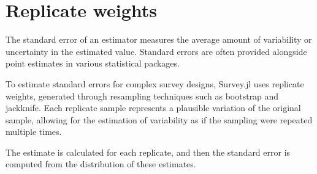 \documentclass{juliacon}
\begin{document}


\section{Replicate weights}

The standard error of an estimator measures the average amount of variability or uncertainty in the estimated value. Standard errors are often provided alongside point estimates in various statistical packages.

To estimate standard errors for complex survey designs, Survey.jl uses replicate weights, generated through resampling techniques such as bootstrap and jackknife. Each replicate sample represents a plausible variation of the original sample, allowing for the estimation of variability as if the sampling were repeated multiple times.

The estimate is calculated for each replicate, and then the standard error is computed from the distribution of these estimates. 

\end{document}
